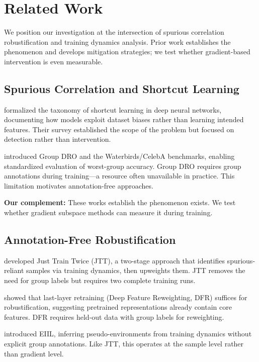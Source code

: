 \section{Related Work}

We position our investigation at the intersection of spurious correlation robustification and training dynamics analysis. Prior work establishes the phenomenon and develops mitigation strategies; we test whether gradient-based intervention is even measurable.

\subsection{Spurious Correlation and Shortcut Learning}

\citet{geirhos2020shortcut} formalized the taxonomy of shortcut learning in deep neural networks, documenting how models exploit dataset biases rather than learning intended features. Their survey established the scope of the problem but focused on detection rather than intervention.

\citet{sagawa2020distributionally} introduced Group DRO and the Waterbirds/CelebA benchmarks, enabling standardized evaluation of worst-group accuracy. Group DRO requires group annotations during training---a resource often unavailable in practice. This limitation motivates annotation-free approaches.

\textbf{Our complement:} These works establish the phenomenon exists. We test whether gradient subspace methods can measure it during training.

\subsection{Annotation-Free Robustification}

\citet{liu2021just} developed Just Train Twice (JTT), a two-stage approach that identifies spurious-reliant samples via training dynamics, then upweights them. JTT removes the need for group labels but requires two complete training runs.

\citet{kirichenko2023last} showed that last-layer retraining (Deep Feature Reweighting, DFR) suffices for robustification, suggesting pretrained representations already contain core features. DFR requires held-out data with group labels for reweighting.

\citet{creager2021environment} introduced EIIL, inferring pseudo-environments from training dynamics without explicit group annotations. Like JTT, this operates at the sample level rather than gradient level.

